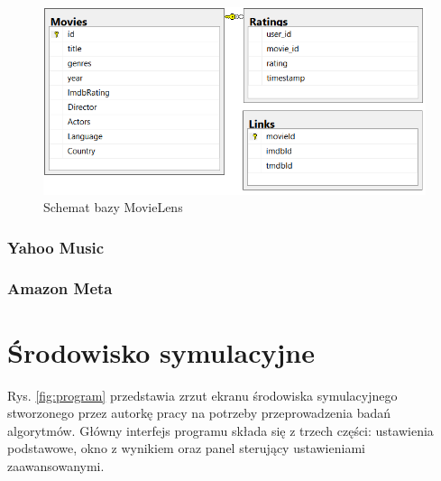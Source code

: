 \documentclass[twoside]{iisthesis}
\begin{document}
			\begin{figure}[!ht] 
				\centering
				\includegraphics[width=1\textwidth]{movielens}
				\caption{Schemat bazy MovieLens}
				\label{fig:movielens_schema}
			\end{figure}
		
		\subsubsection{Yahoo Music}
		
		
		\subsubsection{Amazon Meta}
		
		
			\cite{leskovec2007dynamics}
		
	\section{Środowisko symulacyjne}
	
		Rys. \ref{fig:program} przedstawia zrzut ekranu środowiska symulacyjnego stworzonego przez autorkę pracy na potrzeby przeprowadzenia badań algorytmów. Główny interfejs programu składa się z trzech części: ustawienia podstawowe, okno z wynikiem oraz panel sterujący ustawieniami zaawansowanymi. 
	
\end{document}
